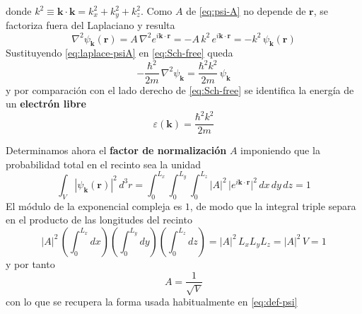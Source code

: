 \documentclass{article}
\begin{document}
donde $k^2\equiv \mathbf k\cdot\mathbf k=k_x^2+k_y^2+k_z^2$. Como $A$ de \eqref{eq:psi-A} no depende de $\mathbf r$, se factoriza fuera del Laplaciano y resulta
\begin{equation}\label{eq:laplace-psiA}
\nabla^2\psi_{\mathbf k}(\mathbf r)=A\,\nabla^2 e^{i\mathbf k\cdot\mathbf r}
=-A\,k^2\,e^{i\mathbf k\cdot\mathbf r}
=-k^2\,\psi_{\mathbf k}(\mathbf r)
\end{equation}
Sustituyendo \eqref{eq:laplace-psiA} en \eqref{eq:Sch-free} queda
\begin{equation}\label{eq:energia-libre}
-\frac{\hbar^2}{2m}\,\nabla^2\psi_{\mathbf k}
=\frac{\hbar^2 k^2}{2m}\,\psi_{\mathbf k}
\end{equation}
y por comparación con el lado derecho de \eqref{eq:Sch-free} se identifica la energía de un \textcolor{Cerulean}{\textbf{electrón libre}}
\begin{equation}\label{eq:E-of-k}
\varepsilon(\mathbf k)=\frac{\hbar^2 k^2}{2m}
\end{equation}

Determinamos ahora el \textcolor{Cerulean}{\textbf{factor de normalización}} $A$ imponiendo que la probabilidad total en el recinto sea la unidad
\begin{equation}\label{eq:norma-cond}
\int_V|\psi_{\mathbf k}(\mathbf r)|^2\,d^3 r
=\int_{0}^{L_x}\!\!\int_{0}^{L_y}\!\!\int_{0}^{L_z}
|A|^2\,\big|e^{i\mathbf k\cdot\mathbf r}\big|^2\,dx\,dy\,dz
=1
\end{equation}
El módulo de la exponencial compleja es $1$, de modo que la integral triple separa en el producto de las longitudes del recinto
\begin{equation}\label{eq:norma-eval}
|A|^2\,
\left(\int_{0}^{L_x}dx\right)
\left(\int_{0}^{L_y}dy\right)
\left(\int_{0}^{L_z}dz\right)
=|A|^2\,L_xL_yL_z
=|A|^2\,V
=1
\end{equation}
y por tanto
\begin{equation}\label{eq:A-valor}
A=\frac{1}{\sqrt V}
\end{equation}
con lo que se recupera la forma usada habitualmente en \eqref{eq:def-psi}
\end{document}
